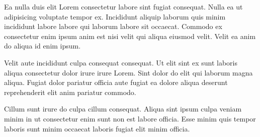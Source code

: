 Ea nulla duis elit Lorem consectetur labore sint fugiat consequat. Nulla ea ut adipisicing voluptate tempor ex. Incididunt aliquip laborum quis minim incididunt labore labore qui laborum labore sit occaecat. Commodo ex consectetur enim ipsum anim est nisi velit qui aliqua eiusmod velit. Velit ea anim do aliqua id enim ipsum.

Velit aute incididunt culpa consequat consequat. Ut elit sint ex sunt laboris aliqua consectetur dolor irure irure Lorem. Sint dolor do elit qui laborum magna aliqua. Fugiat dolor pariatur officia aute fugiat ea dolore aliqua deserunt reprehenderit elit anim pariatur commodo.

Cillum sunt irure do culpa cillum consequat. Aliqua sint ipsum culpa veniam minim in ut consectetur enim sunt non est labore officia. Esse minim quis tempor laboris sunt minim occaecat laboris fugiat elit minim officia.